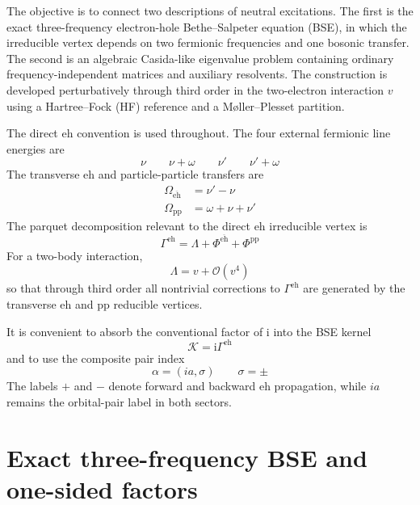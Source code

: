 \documentclass[aip,jcp,reprint,noshowkeys,superscriptaddress]{revtex4-1}
\newcommand{\ii}{\mathrm{i}}
\newcommand{\eh}{\text{eh}}
\newcommand{\teh}{\overline{\text{eh}}}
\newcommand{\pp}{\text{pp}}
\begin{document}
The objective is to connect two descriptions of neutral excitations.
The first is the exact three-frequency electron-hole Bethe--Salpeter equation (BSE), in which the irreducible vertex depends on two fermionic frequencies and one bosonic transfer.
The second is an algebraic Casida-like eigenvalue problem containing ordinary frequency-independent matrices and auxiliary resolvents.
The construction is developed perturbatively through third order in the two-electron interaction $v$ using a Hartree--Fock (HF) reference and a M\o ller--Plesset partition.

The direct $\eh$ convention is used throughout.
The four external fermionic line energies are
\begin{equation}
	\nu
	\qquad
	\nu+\omega
	\qquad
	\nu'
	\qquad
	\nu'+\omega
	\label{eq:external_frequencies}
\end{equation}
The transverse $\eh$ and particle-particle transfers are
\begin{align}
	\Omega_{\teh}
	&=
	\nu'-\nu
	\\
	\Omega_\pp
	&=
	\omega+\nu+\nu'
	\label{eq:channel_transfers}
\end{align}
The parquet decomposition relevant to the direct $\eh$ irreducible vertex is
\begin{equation}
	\Gamma^\eh
	=
	\Lambda
	+
	\Phi^{\teh}
	+
	\Phi^\pp
	\label{eq:Gamma_parquet}
\end{equation}
For a two-body interaction,
\begin{equation}
	\Lambda
	=
	v
	+
	\mathcal O(v^4)
	\label{eq:Lambda_order}
\end{equation}
so that through third order all nontrivial corrections to $\Gamma^\eh$ are generated by the transverse $\eh$ and $\pp$ reducible vertices.

It is convenient to absorb the conventional factor of $\ii$ into the BSE kernel
\begin{equation}
	\mathcal K
	=
	\ii\Gamma^\eh
	\label{eq:K_def}
\end{equation}
and to use the composite pair index
\begin{equation}
	\alpha
	=
	(ia,\sigma)
	\qquad
	\sigma=\pm
	\label{eq:alpha_def}
\end{equation}
The labels $+$ and $-$ denote forward and backward $\eh$ propagation, while $ia$ remains the orbital-pair label in both sectors.

\section[Exact three-frequency BSE]{Exact three-frequency BSE and one-sided factors}
\label{sec:exact_bse}
\end{document}
